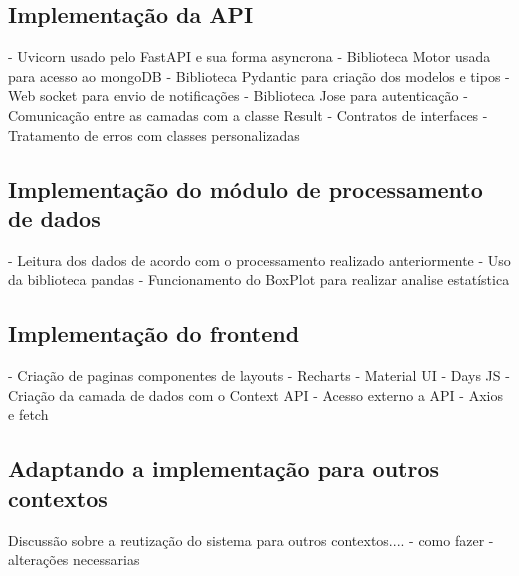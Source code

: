 \subsection[Implementação da API]{Implementação da API}

- Uvicorn usado pelo FastAPI e sua forma asyncrona
- Biblioteca Motor usada para acesso ao mongoDB
- Biblioteca Pydantic para criação dos modelos e tipos
- Web socket para envio de notificações
- Biblioteca Jose para autenticação
- Comunicação entre as camadas com a classe Result
- Contratos de interfaces
- Tratamento de erros com classes personalizadas


\subsection[Implementação do módulo de processamento de dados]{Implementação do módulo de processamento de dados}
- Leitura dos dados de acordo com o processamento realizado anteriormente
- Uso da biblioteca pandas
- Funcionamento do BoxPlot para realizar analise estatística

\subsection[Implementação do frontend]{Implementação do frontend}
- Criação de paginas componentes de layouts
- Recharts
- Material UI
- Days JS
- Criação da camada de dados com o Context API
- Acesso externo a API
- Axios e fetch

\subsection[Adaptando a implementação para outros contextos]{Adaptando a implementação para outros contextos}
Discussão sobre a reutização do sistema para outros contextos....
- como fazer
- alterações necessarias

